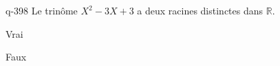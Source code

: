 \begin{truefalse}{q-398}
Le trinôme $X^2-3X+3$ a deux racines distinctes dans $\mathbb R$.
\item Vrai
\item* Faux
\end{truefalse}

